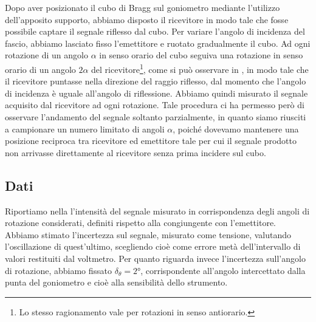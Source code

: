 \documentclass[a4paper]{article}
\begin{document}
Dopo aver posizionato il cubo di Bragg sul goniometro mediante l'utilizzo dell'apposito supporto, abbiamo disposto il ricevitore in modo tale che fosse possibile captare il segnale riflesso dal cubo. Per variare l'angolo di incidenza del fascio, abbiamo lasciato fisso l'emettitore e ruotato gradualmente il cubo. Ad ogni rotazione di un angolo $\alpha$ in senso orario del cubo seguiva una rotazione in senso orario di un angolo $2\alpha$ del ricevitore\footnote{Lo stesso ragionamento vale per rotazioni in senso antiorario.}, come si può osservare in , in modo tale che il ricevitore puntasse nella direzione del raggio riflesso, dal momento che l'angolo di incidenza è uguale all'angolo di riflessione. Abbiamo quindi misurato il segnale acquisito dal ricevitore ad ogni rotazione. Tale procedura ci ha permesso però di osservare l'andamento del segnale soltanto parzialmente, in quanto siamo riusciti a campionare un numero limitato di angoli $\alpha$, poiché dovevamo mantenere una posizione reciproca tra ricevitore ed emettitore tale per cui il segnale prodotto non arrivasse direttamente al ricevitore senza prima incidere sul cubo.

\subsection{Dati}
Riportiamo nella  l'intensità del segnale misurato in corrispondenza degli angoli di rotazione considerati, definiti rispetto 
alla congiungente con l'emettitore.
Abbiamo stimato l'incertezza sul segnale, misurato come tensione, valutando l'oscillazione di quest'ultimo, scegliendo cioè come errore metà dell'intervallo di valori restituiti dal voltmetro. Per quanto riguarda invece l'incertezza sull'angolo di rotazione, abbiamo fissato $\delta_{\theta}=\ang{2}$, corrispondente all'angolo intercettato dalla punta del goniometro e cioè alla sensibilità dello strumento.
\end{document}
